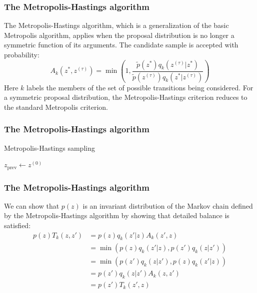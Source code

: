 \documentclass{beamer}
\begin{document}
\begin{frame}
    \frametitle{The Metropolis-Hastings algorithm}
    The Metropolis-Hastings algorithm, which is a generalization of the basic Metropolis algorithm, applies when the proposal distribution is no longer a symmetric function of its arguments. The candidate sample is accepted with probability:
    \begin{equation*}
        A_{k}(z^{*},z^{(\tau)})=\min(1,\frac{\tilde{p}(z^{*})q_{k}(z^{(\tau)}|z^{*})}{\tilde{p}(z^{(\tau)})q_{k}(z^{*}|z^{(\tau)})})
    \end{equation*}
    Here $k$ labels the members of the set of possible transitions being considered. For a symmetric proposal distribution, the Metropolis-Hastings criterion reduces to the standard Metropolis criterion.
\end{frame}

\begin{frame}
    \frametitle{The Metropolis-Hastings algorithm}
    \begin{algorithm}[H]
        \caption{Metropolis-Hastings sampling}
        $z_{\mathrm{prev}}\gets{}z^{(0)}$\;
        \;
    \end{algorithm}
\end{frame}

\begin{frame}
    \frametitle{The Metropolis-Hastings algorithm}
    We can show that $p(z)$ is an invariant distribution of the Markov chain defined by the Metropolis-Hastings algorithm by showing that detailed balance is satisfied:
    \begin{align*}
        p(z)T_{k}(z,z')&=p(z)q_{k}(z'|z)A_{k}(z',z) \\
        &=\min(p(z)q_{k}(z'|z),p(z')q_{k}(z|z')) \\
        &=\min(p(z')q_{k}(z|z'),p(z)q_{k}(z'|z)) \\
        &=p(z')q_{k}(z|z')A_{k}(z,z') \\
        &=p(z')T_{k}(z',z)
    \end{align*}
\end{frame}
\end{document}
